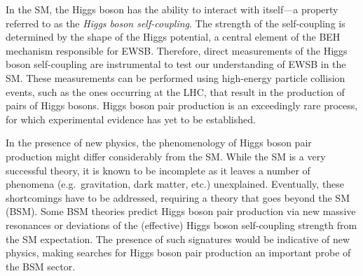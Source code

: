 In the SM, the Higgs boson has the ability to interact with itself---a property
referred to as the \emph{Higgs boson self-coupling}. The strength of the
self-coupling is determined by the shape of the Higgs potential, a central
element of the BEH mechanism responsible for EWSB.
Therefore, direct measurements of the Higgs boson self-coupling are instrumental
to test our understanding of EWSB in the SM. These measurements can be performed
using high-energy particle collision events, such as the ones occurring at the
LHC, that result in the production of pairs of Higgs bosons. Higgs boson pair
production is an exceedingly rare process, for which experimental evidence has
yet to be established.


In the presence of new physics, the phenomenology of Higgs boson pair production
might differ considerably from the SM. While the SM is a very successful theory,
it is known to be incomplete as it leaves a number of phenomena
(e.g.~gravitation, dark matter, etc.) unexplained. Eventually, these
shortcomings have to be addressed, requiring a theory that goes beyond the SM
(BSM). Some BSM theories predict Higgs boson pair production via new massive
resonances or deviations of the (effective) Higgs boson self-coupling strength
from the SM expectation. The presence of such signatures would be indicative of
new physics, making searches for Higgs boson pair production an important probe
of the BSM sector.




